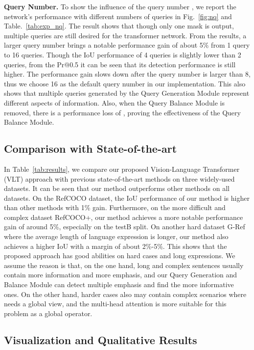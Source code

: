 \documentclass[10pt,twocolumn,letterpaper]{article}
\begin{document}
\textbf{Query Number.} To show the influence of the query number , we report the network's performance with different numbers of queries in Fig.~\ref{fig:nq} and Table.~\ref{tab:exp_nq}. The result shows that though only one mask is output, multiple queries are still desired for the transformer network. From the results, a larger query number brings a notable performance gain of about 5\% from 1 query to 16 queries. Though the IoU performance of 4 queries is slightly lower than 2 queries, from the Pr@0.5 it can be seen that its detection performance is still higher. The performance gain slows down after the query number is larger than 8, thus we choose 16 as the default query number in our implementation. This also shows that multiple queries generated by the Query Generation Module represent different aspects of information. Also, when the Query Balance Module is removed, there is a performance loss of , proving the effectiveness of the Query Balance Module.

\subsection{Comparison with State-of-the-art}

In Table~\ref{tab:results}, we compare our proposed Vision-Language Transformer (VLT) approach with previous state-of-the-art methods on three widely-used datasets.
It can be seen that our method outperforms other methods on all datasets. On the RefCOCO dataset, the IoU performance of our method is higher than other methods with 1\% gain. Furthermore, on the more difficult and complex dataset RefCOCO+, our method achieves a more notable performance gain of around 5\%, especially on the testB split. On another hard dataset G-Ref where the average length of language expression is longer, our method also achieves a higher IoU with a margin of about 2\%-5\%. This shows that the proposed approach has good abilities on hard cases and long expressions. We assume the reason is that, on the one hand, long and complex sentences usually contain more information and more emphasis, and our Query Generation and Balance Module can detect multiple emphasis and find the more informative ones. On the other hand, harder cases also may contain complex scenarios where needs a global view, and the multi-head attention is more suitable for this problem as a global operator.

\subsection{Visualization and Qualitative Results}
\end{document}
